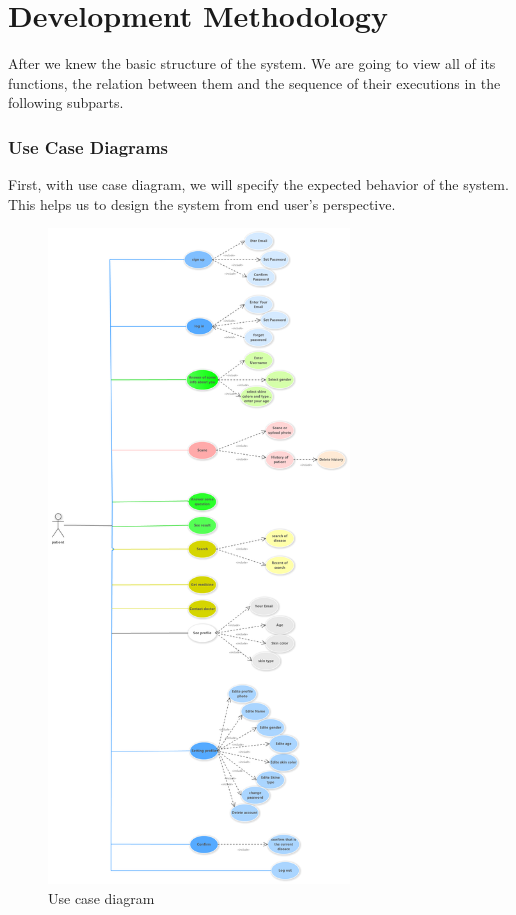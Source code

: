 \section{Development Methodology}
After we knew the basic structure of the system. We are going to view 
all of its functions, the relation between them  and the sequence of 
their executions in the following subparts.
\subsubsection{Use Case Diagrams}
First, with use case diagram, we will specify the expected behavior of the system. This helps us to 
design the system from end user's perspective.
\begin{figure}[!ht]
    \centering
    \includegraphics[width =8cm]{backmatter/figures/usecase.png}
    \caption{Use case diagram}
\end{figure}
\newpage
